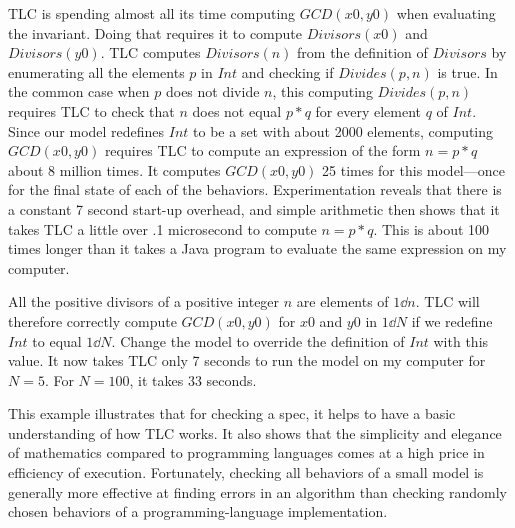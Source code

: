 TLC is spending almost all its time computing $GCD(x0, y0)$ when
evaluating the invariant.  Doing that requires it to compute
$Divisors(x0)$ and $Divisors(y0)$.  TLC computes $Divisors(n)$ from
the definition of $Divisors$ by enumerating all the elements $p$ in
$Int$ and checking if $Divides(p,n)$ is true.  In the common case when
$p$ does not divide $n$, this computing $Divides(p,n)$ requires TLC to
check that $n$ does not equal $p*q$ for every element $q$ of $Int$.
Since our model redefines $Int$ to be a set with about 2000 elements,
computing $GCD(x0, y0)$ requires TLC to compute an expression of the
form $n=p*q$ about 8 million times.  It computes $GCD(x0, y0)$ 25
times for this model---once for the final state of each of the
behaviors.  Experimentation reveals that there is a constant 7 second
start-up overhead, and simple arithmetic then shows that it takes TLC
a little over .1 microsecond to compute $n=p*q$.  This is about 100
times longer than it takes a Java program to evaluate the same
expression on my computer.

All the positive divisors of a positive integer $n$ are elements of
$1\dd n$.  TLC will therefore correctly compute $GCD(x0,y0)$ for $x0$
and $y0$ in $1\dd N$ if we redefine $Int$ to equal $1\dd N$.  Change
the model to override the definition of $Int$ with this value.  It now
takes TLC only 7 seconds to run the model on my computer for $N=5$.
For $N=100$, it takes 33 seconds.  

This example illustrates that for checking a spec, it helps to have a
basic understanding of how TLC works.  It also shows that the
simplicity and elegance of mathematics compared to programming
languages comes at a high price in efficiency of execution.
Fortunately, checking all behaviors of a small model is generally more
effective at finding errors in an algorithm than checking randomly
chosen behaviors of a programming-language implementation.

\bigskip

